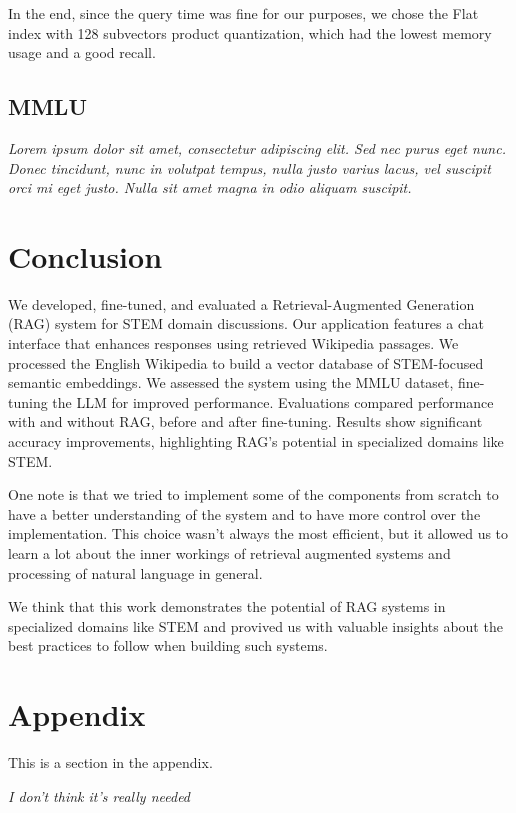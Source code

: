 \documentclass[11pt]{article}
\begin{document}
In the end, since the query time was fine for our purposes, we chose the Flat index with 128
subvectors product quantization, which had the lowest memory usage and a good recall.


\subsection{MMLU}
\textit{Lorem ipsum dolor sit amet, consectetur adipiscing elit. Sed nec purus eget
nunc. Donec tincidunt, nunc in volutpat tempus, nulla justo varius lacus, vel
suscipit orci mi eget justo. Nulla sit amet magna in odio aliquam suscipit.}

\section{Conclusion}
We developed, fine-tuned, and evaluated a Retrieval-Augmented Generation (RAG) 
system for STEM domain discussions. Our application features a chat interface 
that enhances responses using retrieved Wikipedia passages. We processed the 
English Wikipedia to build a vector database of STEM-focused semantic 
embeddings. 
We assessed the system using the MMLU 
dataset, fine-tuning the LLM for improved performance. Evaluations compared 
performance with and without RAG, before and after fine-tuning.
Results show significant accuracy improvements, highlighting RAG's potential 
in specialized domains like STEM.

One note is that we tried to implement some of the components from scratch
to have a better understanding of the system and to have more control over the
implementation.
This choice wasn't always the most efficient, but it allowed us to learn a lot
about the inner workings of retrieval augmented systems and processing of natural 
language in general. 

We think that this work demonstrates the potential of RAG systems in specialized 
domains like STEM and provived us with valuable insights about the best practices 
to follow when building such systems.




\appendix

\section{Appendix}
\label{sec:appendix}

This is a section in the appendix.

\textit{I don't think it's really needed}
\end{document}
